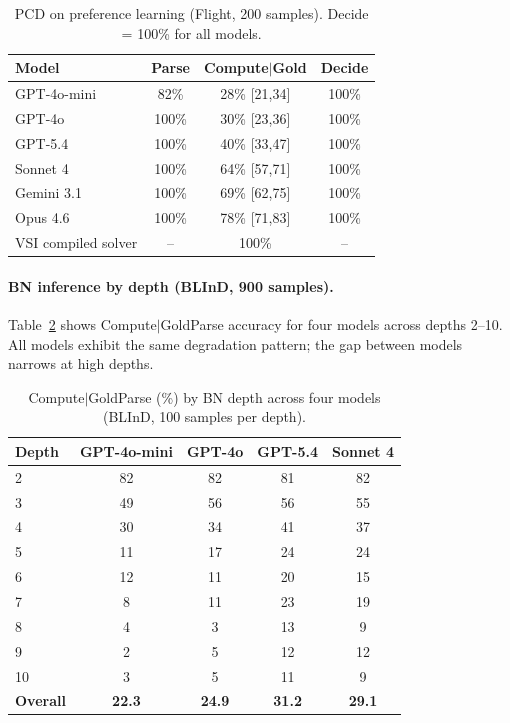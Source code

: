 \documentclass{article}
\begin{document}
\begin{table}[ht]
\centering
\small
\caption{PCD on preference learning (Flight, 200 samples). Decide = 100\% for all models.}
\label{tab:pcd_multimodel_pref}
\begin{tabular}{@{}lccc@{}}
\toprule
Model & Parse & Compute$\mid$Gold & Decide \\
\midrule
GPT-4o-mini & 82\% & 28\% {\scriptsize [21,34]} & 100\% \\
GPT-4o & 100\% & 30\% {\scriptsize [23,36]} & 100\% \\
GPT-5.4 & 100\% & 40\% {\scriptsize [33,47]} & 100\% \\
Sonnet 4 & 100\% & 64\% {\scriptsize [57,71]} & 100\% \\
Gemini 3.1 & 100\% & 69\% {\scriptsize [62,75]} & 100\% \\
Opus 4.6 & 100\% & 78\% {\scriptsize [71,83]} & 100\% \\
\midrule
VSI compiled solver & -- & 100\% & -- \\
\bottomrule
\end{tabular}
\end{table}

\paragraph{BN inference by depth (BLInD, 900 samples).}
Table~\ref{tab:pcd_depth_detail} shows Compute$\mid$GoldParse accuracy for four models across depths 2--10.
All models exhibit the same degradation pattern; the gap between models narrows at high depths.

\begin{table}[ht]
\centering
\small
\caption{Compute$\mid$GoldParse (\%) by BN depth across four models (BLInD, 100 samples per depth).}
\label{tab:pcd_depth_detail}
\begin{tabular}{@{}lcccc@{}}
\toprule
Depth & GPT-4o-mini & GPT-4o & GPT-5.4 & Sonnet 4 \\
\midrule
2 & 82 & 82 & 81 & 82 \\
3 & 49 & 56 & 56 & 55 \\
4 & 30 & 34 & 41 & 37 \\
5 & 11 & 17 & 24 & 24 \\
6 & 12 & 11 & 20 & 15 \\
7 & 8 & 11 & 23 & 19 \\
8 & 4 & 3 & 13 & 9 \\
9 & 2 & 5 & 12 & 12 \\
10 & 3 & 5 & 11 & 9 \\
\midrule
\textbf{Overall} & \textbf{22.3} & \textbf{24.9} & \textbf{31.2} & \textbf{29.1} \\
\bottomrule
\end{tabular}
\end{table}

\clearpage

\end{document}
